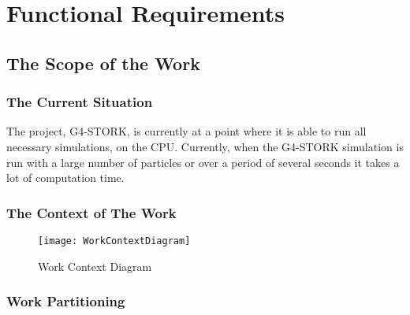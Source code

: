 \documentclass[12pt]{article}
\newcommand{\todo}[1]{\textcolor{red}{[TODO: #1]}} \else
\newcommand{\authornote}[3]{} \newcommand{\todo}[1]{} \fi
\newcommand{\ds}[1]{\authornote{blue}{DS}{#1}} %
\newcommand{\vr}[1]{\authornote{green}{VR}{#1}}
\begin{document}
\section{Functional Requirements}

\subsection{The Scope of the Work} %
\subsubsection{The Current Situation}
The project, G4-STORK, is currently at a point where it is able to run all necessary simulations, on the CPU. Currently, when the G4-STORK simulation is run with a large number of particles or over a period of several seconds it takes a lot of computation time.

\subsubsection{The Context of The Work}
\begin{figure}[h]
\caption{Work Context Diagram}
\texttt{[image: WorkContextDiagram]} 
\end{figure} 

\ds{Figure caption?}\vr{Added caption and revised diagram}
\subsubsection{Work Partitioning}
%
\end{document}
